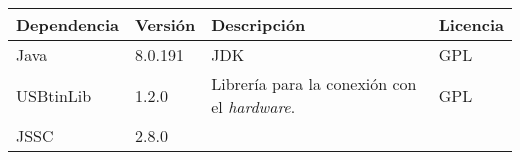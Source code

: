 \begin{longtable}[]{@{}llll@{}}
\toprule
\begin{minipage}[b]{0.18\columnwidth}\raggedright\strut
Dependencia\strut
\end{minipage} & \begin{minipage}[b]{0.10\columnwidth}\raggedright\strut
Versión\strut
\end{minipage} & \begin{minipage}[b]{0.49\columnwidth}\raggedright\strut
Descripción\strut
\end{minipage} & \begin{minipage}[b]{0.11\columnwidth}\raggedright\strut
Licencia\strut
\end{minipage}\tabularnewline
\midrule
\endhead
\begin{minipage}[t]{0.18\columnwidth}\raggedright\strut
Java\strut
\end{minipage} & \begin{minipage}[t]{0.08\columnwidth}\raggedright\strut
8.0.191\strut
\end{minipage} & \begin{minipage}[t]{0.49\columnwidth}\raggedright\strut
JDK\strut
\end{minipage} & \begin{minipage}[t]{0.11\columnwidth}\raggedright\strut
GPL\strut
\end{minipage}\tabularnewline
\begin{minipage}[t]{0.18\columnwidth}\raggedright\strut
USBtinLib\strut
\end{minipage} & \begin{minipage}[t]{0.08\columnwidth}\raggedright\strut
1.2.0\strut
\end{minipage} & \begin{minipage}[t]{0.49\columnwidth}\raggedright\strut
Librería para la conexión con el \emph{hardware}.\strut
\end{minipage} & \begin{minipage}[t]{0.11\columnwidth}\raggedright\strut
GPL\strut
\end{minipage}\tabularnewline
\begin{minipage}[t]{0.18\columnwidth}\raggedright\strut
JSSC\strut
\end{minipage} & \begin{minipage}[t]{0.08\columnwidth}\raggedright\strut
2.8.0\strut
\end{minipage} & \begin{minipage}[t]{0.49\columnwidth}\raggedright\strut

\end{minipage}
\end{longtable}
